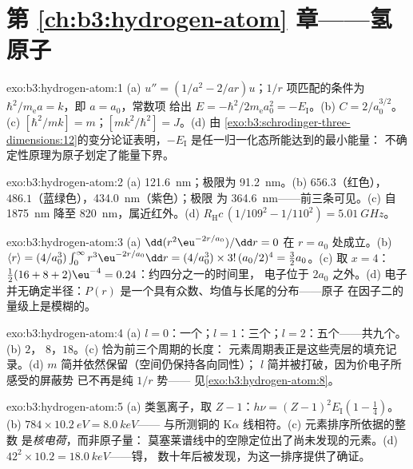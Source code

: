 \section*{第 \ref{ch:b3:hydrogen-atom} 章——氢原子}

\begin{solution}{exo:b3:hydrogen-atom:1}
(a) $u'' = (1/a^2 - 2/ar)u$；$1/r$ 项匹配的条件为
$\hbar^2/m_{\text{e}}a = k$，即 $a = a_0$，常数项
给出 $E = -\hbar^2/2m_{\text{e}}a_0^2 = -E_{\text{I}}$。(b) $C =
2/a_0^{3/2}$。(c) $[\hbar^2/mk] = \unit{m}$；$[mk^2/\hbar^2] =
\unit{J}$。(d) 由
\cref{exo:b3:schrodinger-three-dimensions:12}的变分论证表明，$-E_{\text{I}}$
是任一归一化态所能达到的最小能量：
不确定性原理为原子划定了能量下界。
\end{solution}

\begin{solution}{exo:b3:hydrogen-atom:2}
(a) \qty{121.6}{nm}；极限为 \qty{91.2}{nm}。(b) $656.3$（红色），
$486.1$（蓝绿色），\qty{434.0}{nm}（紫色）；极限
为 \qty{364.6}{nm}——前三条可见。(c)
自 \qty{1875}{nm} 降至 \qty{820}{nm}，属近红外。(d)
$R_{\text{H}}c\,(1/109^2 - 1/110^2) = \qty{5.01}{GHz}$。
\end{solution}

\begin{solution}{exo:b3:hydrogen-atom:3}
(a) $\dd(r^2\eu^{-2r/a_0})/\dd r = 0$ 在 $r = a_0$ 处成立。(b) $\langle r\rangle = (4/a_0^3)\int_0^\infty
r^3\eu^{-2r/a_0}\dd r = (4/a_0^3)\times 3!\,(a_0/2)^4 = \tfrac32
a_0$。(c) 取 $x = 4$：
$\tfrac12(16 + 8 + 2)\eu^{-4} = 0.24$：约四分之一的时间里，
电子位于 $2a_0$ 之外。(d) 电子并无确定半径：$P(r)$
是一个具有众数、均值与长尾的分布——原子
在因子二的量级上是模糊的。
\end{solution}

\begin{solution}{exo:b3:hydrogen-atom:4}
(a) $l = 0$：一个；$l = 1$：三个；$l = 2$：五个——共九个。(b) $2$，
$8$，$18$。(c) 恰为前三个周期的长度：
元素周期表正是这些壳层的填充记录。(d)
$m$ 简并依然保留（空间仍保持各向同性）；
$l$ 简并被打破，因为价电子所感受的屏蔽势
已不再是纯 $1/r$ 势——
见\cref{exo:b3:hydrogen-atom:8}。
\end{solution}

\begin{solution}{exo:b3:hydrogen-atom:5}
(a) 类氢离子，取 $Z - 1$：$h\nu = (Z-1)^2E_{\text{I}}(1 -
\tfrac14)$。(b) $784 \times \qty{10.2}{eV} = \qty{8.0}{keV}$——
与所测铜的 K$\alpha$ 线相符。(c) 元素排序所依据的整数
是\emph{核电荷}，而非原子量：
莫塞莱谱线中的空隙定位出了尚未发现的元素。(d)
$42^2 \times 10.2 = \qty{18.0}{keV}$——锝，
数十年后被发现，为这一排序提供了确证。
\end{solution}

